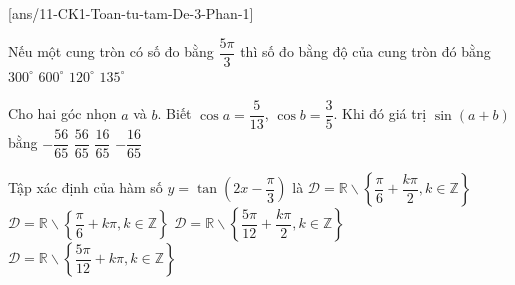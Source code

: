 \begin{name}
	{\tenchude}
	{\tendethi}
	{\tentruong}
	{\thoigian}
\end{name}

\caulc
{}[ans/11-CK1-Toan-tu-tam-De-3-Phan-1]
\begin{ex}%
Nếu một cung tròn có số đo bằng $\dfrac{5\pi}{3}$ thì số đo bằng độ của cung tròn đó bằng
\choice
{\True $300^\circ$}
{$600^\circ$}
{$120^\circ$}
{$135^\circ$}
\end{ex}
\begin{ex}%
Cho hai góc nhọn $a$ và $b$. Biết $\cos a=\dfrac{5}{13}$, $\cos b=\dfrac{3}{5}$. Khi đó giá trị $\sin (a+b)$ bằng
\choice
{$-\dfrac{56}{65}$}
{\True $\dfrac{56}{65}$}
{$\dfrac{16}{65}$}
{$-\dfrac{16}{65}$}
\end{ex}

\begin{ex}%
Tập xác định của hàm số $y=\tan \left(2 x-\dfrac{\pi}{3}\right)$ là
\choice
{$\mathscr{D}=\mathbb{R} \backslash\left\{\dfrac{\pi}{6}+\dfrac{k \pi}{2}, k \in \mathbb{Z}\right\}$}
{$\mathscr{D}=\mathbb{R} \backslash\left\{\dfrac{\pi}{6}+k \pi, k \in \mathbb{Z}\right\}$} 
{\True $\mathscr{D}=\mathbb{R} \backslash\left\{\dfrac{5 \pi}{12}+\dfrac{k \pi}{2}, k \in \mathbb{Z}\right\}$}
{$\mathscr{D}=\mathbb{R} \backslash\left\{\dfrac{5 \pi}{12}+k \pi, k \in \mathbb{Z}\right\}$}
\end{ex}

